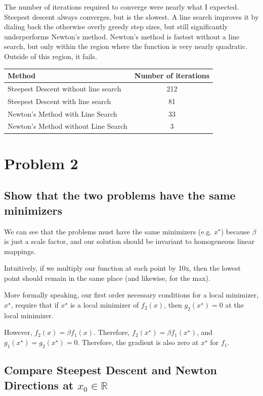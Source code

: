 \documentclass{article}
\begin{document}
The number of iterations required to converge were nearly what I
expected. Steepest descent always converges, but is the slowest. A line
search improves it by dialing back the otherwise overly greedy step
sizes, but still significantly underperforms Newton's method. 
Newton's method is fastest without a line search, but only within the
region where the function is very nearly quadratic. Outside of this
region, it fails. 
\newline
\begin{tabular}{| l | c |}
 \hline
 Method & Number of iterations \\
 \hline
  Steepest Descent without line search & 212 \\
  Steepest Descent with line search & 81     \\
  Newton's Method with Line Search & 33      \\
  Newton's Method without Line Search & 3    \\
 \hline
\end{tabular}

\section{Problem 2}

\subsection{Show that the two problems have the same minimizers}

We can see that the problems must have the same minimizers
(e.g. $x^\star$) because $\beta$ is just a scale factor, and our solution
should be invariant to homogeneous linear mappings. 

Intuitively, if we multiply our function at each point by 10x, then 
the lowest point should remain in the same place (and likewise, for the
max). 

More formally speaking, our first order necessary conditions for a local
minimizer, $x^\star$, require that if $x^\star$ is a local minimizer of
$f_2(x)$, then $g_2(x^\star) = 0 $ at the local minimizer. 

However, $f_2(x) = \beta f_1(x)$. Therefore,  $f_2(x^\star) = \beta
f_1(x^\star)$, and $g_1(x^\star) = g_2(x^\star) = 0 $. Therefore, the
gradient is also zero at $x^\star$ for $f_1$.

\subsection{Compare Steepest Descent and Newton Directions at $x_0 \in \mathbb{R}$}
\end{document}
